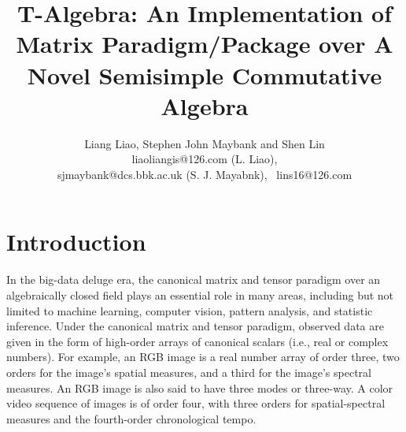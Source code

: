 \documentclass[12pt,reqno]{amsart}
\numberwithin{equation}{section}
\numberwithin{figure}{section}
\numberwithin{table}{section}
\theoremstyle{definition}
\begin{document}
\title[T-Algebra and A Matrix Paradigm over T-Algebra]
{T-Algebra: An Implementation of Matrix Paradigm/Package over A Novel Semisimple Commutative Algebra 
} 

\author[Liang Liao, Stephen John Maybank and Shen Lin]{Liang Liao, 
Stephen John Maybank and Shen Lin \vspace{0.5em}\\
liaoliangis@126.com (L. Liao), \\
sjmaybank@dcs.bbk.ac.uk (S. J. Mayabnk),~ 
lins16@126.com
}







\maketitle



\tableofcontents







\section{Introduction}
\label{section:Introduction}


In the big-data deluge era, the canonical matrix and tensor paradigm over an algebraically closed field plays an essential role in many areas, including but not limited to machine learning, computer vision, pattern analysis, and statistic inference. Under the canonical matrix and tensor paradigm, observed data are given in the form of high-order arrays of canonical scalars (i.e., real or complex numbers).
For example, an RGB image is a real number array of order three, two orders for the image's spatial measures, and a third for the image's spectral measures. An RGB image is also said to have three modes or three-way. A color video sequence of images is of order four, with three orders for spatial-spectral measures and the fourth-order chronological tempo.
\end{document}
